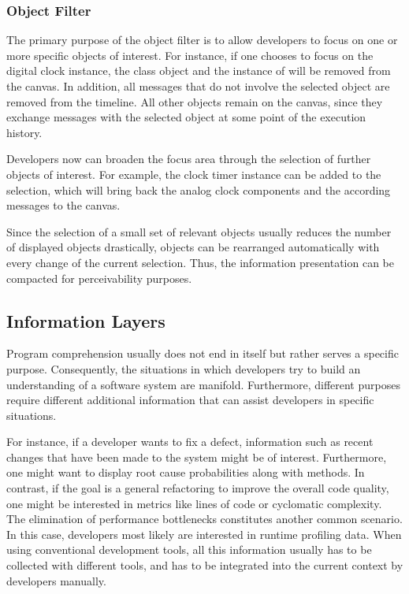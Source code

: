 \subsubsection{Object Filter}
The primary purpose of the object filter is to allow developers to focus on one or more specific objects of interest.
For instance, if one chooses to focus on the digital clock instance, the  class object and the instance of  will be removed from the canvas.
In addition, all messages that do not involve the selected object are removed from the timeline.
All other objects remain on the canvas, since they exchange messages with the selected object at some point of the execution history.

Developers now can broaden the focus area through the selection of further objects of interest.
For example, the clock timer instance can be added to the selection, which will bring back the analog clock components and the according messages to the canvas.

Since the selection of a small set of relevant objects usually reduces the number of displayed objects drastically, objects can be rearranged automatically with every change of the current selection.
Thus, the information presentation can be compacted for perceivability purposes.

\subsection{Information Layers}
\label{ss:ApproachInteractiveLayers}
Program comprehension usually does not end in itself but rather serves a specific purpose.
Consequently, the situations in which developers try to build an understanding of a software system are manifold.
Furthermore, different purposes require different additional information that can assist developers in specific situations.

For instance, if a developer wants to fix a defect, information such as recent changes that have been made to the system might be of interest.
Furthermore, one might want to display root cause probabilities along with methods.
In contrast, if the goal is a general refactoring to improve the overall code quality, one might be interested in metrics like lines of code or cyclomatic complexity.
The elimination of performance bottlenecks constitutes another common scenario.
In this case, developers most likely are interested in runtime profiling data.
When using conventional development tools, all this information usually has to be collected with different tools, and has to be integrated into the current context by developers manually.

